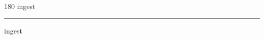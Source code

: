 
\begin{frame}
\begin{center}
\begin{turn}{180}
{\fontsize{2.5cm}{1em}\selectfont ingest}
\end{turn}
\vspace{1em}\par  
\hrule
\vspace{1em}\par  
{\fontsize{2.5cm}{1em}\selectfont ingest}
\end{center}
\end{frame}
